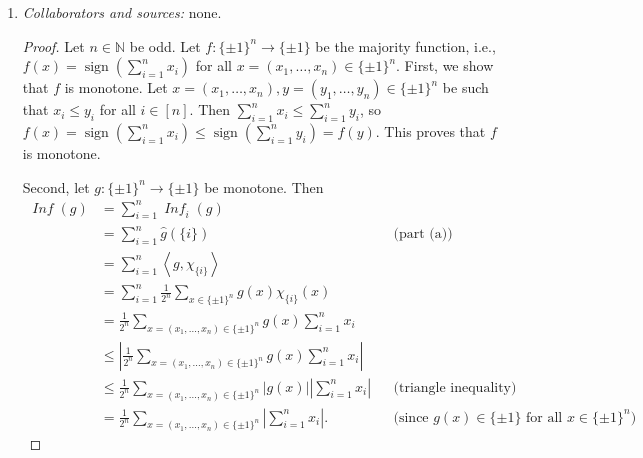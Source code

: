 \documentclass[letterpaper, reqno,11pt]{article}
\newcommand{\NN}{\mathbb{N}}
\DeclareMathOperator{\sign}{sign}
\DeclareMathOperator{\Inf}{\mathit{Inf}}
\begin{document}
\begin{enumerate}
\begin{enumerate}
\begin{proof}
\begin{align*}
        &= \frac{1}{2^n} \sum_{x \in \{ \pm 1 \}^n} \mathds 1\left[f(x) \neq f\left(x^{\oplus 1}\right)\right] \\
        &= \frac{1}{2^n} \cdot 2 \sum_{x' \in \{ \pm 1 \}^{n - 1}} \mathds 1\left[f\left(1, x'\right) \neq f\left(-1, x'\right)\right] \\
        &= \frac{1}{2^{n - 1}} \left|\left\{ x' \in \{ \pm 1 \}^{n - 1} : f\left(1, x'\right) \neq f\left(-1, x'\right) \right\}\right| \\
        &= \hat{f}(\{ 1 \}).
      \end{align*}
      This completes the proof.
    \end{proof}

    \clearpage

    \item \noindent\emph{Collaborators and sources:} none.
    
    \begin{proof}
      Let $n \in \NN$ be odd. Let $f : \{ \pm 1 \}^n \to \{ \pm 1 \}$ be the majority function, i.e., $f(x) = \sign(\sum_{i = 1}^n x_i)$ for all $x = (x_1, \ldots, x_n) \in \{ \pm 1 \}^n$. First, we show that $f$ is monotone. Let $x = (x_1, \ldots, x_n), y = (y_1, \ldots, y_n) \in \{ \pm 1 \}^n$ be such that $x_i \leq y_i$ for all $i \in [n]$. Then $\sum_{i = 1}^n x_i \leq \sum_{i = 1}^n y_i$, so $f(x) = \sign(\sum_{i = 1}^n x_i) \leq \sign(\sum_{i = 1}^n y_i) = f(y)$. This proves that $f$ is monotone.

      Second, let $g : \{ \pm 1 \}^n \to \{ \pm 1 \}$ be monotone. Then
      \begin{align*}
        \Inf(g) &= \sum_{i = 1}^n \Inf_i(g) \\
        &= \sum_{i = 1}^n \hat{g}(\{ i \}) && \text{(part (a))} \\
        &= \sum_{i = 1}^n \left\langle g, \chi_{\{ i \}} \right\rangle \\
        &= \sum_{i = 1}^n \frac{1}{2^n} \sum_{x \in \{ \pm 1 \}^n} g(x) \chi_{\{ i \}}(x) \\
        &= \frac{1}{2^n} \sum_{x = \left(x_1, \ldots, x_n\right) \in \{ \pm 1 \}^n} g(x) \sum_{i = 1}^n x_i \\
        &\leq \left|\frac{1}{2^n} \sum_{x = \left(x_1, \ldots, x_n\right) \in \{ \pm 1 \}^n} g(x) \sum_{i = 1}^n x_i\right| \\
        &\leq \frac{1}{2^n} \sum_{x = \left(x_1, \ldots, x_n\right) \in \{ \pm 1 \}^n} |g(x)| \left|\sum_{i = 1}^n x_i\right| && \text{(triangle inequality)} \\
        &= \frac{1}{2^n} \sum_{x = \left(x_1, \ldots, x_n\right) \in \{ \pm 1 \}^n} \left|\sum_{i = 1}^n x_i\right|. && \text{(since $g(x) \in \{ \pm 1 \}$ for all $x \in \{ \pm 1 \}^n$)}
      \end{align*}


\end{proof}
\end{enumerate}
\end{enumerate}
\end{document}

